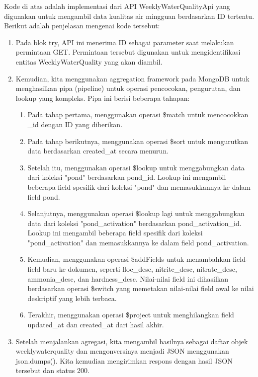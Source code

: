 \begin{enumerate}[1.]
Kode di atas adalah implementasi dari API WeeklyWaterQualityApi yang digunakan untuk mengambil data kualitas air mingguan berdasarkan ID tertentu. Berikut adalah penjelasan mengenai kode tersebut:

\begin{enumerate}

\item Pada blok try, API ini menerima ID sebagai parameter saat melakukan permintaan GET. Permintaan tersebut digunakan untuk mengidentifikasi entitas WeeklyWaterQuality yang akan diambil.

\item Kemudian, kita menggunakan aggregation framework pada MongoDB untuk menghasilkan pipa (pipeline) untuk operasi pencocokan, pengurutan, dan lookup yang kompleks. Pipa ini berisi beberapa tahapan:

\begin{enumerate}
\item Pada tahap pertama, menggunakan operasi \$match untuk mencocokkan \_id dengan ID yang diberikan.
\item Pada tahap berikutnya, menggunakan operasi \$sort untuk mengurutkan data berdasarkan created\_at secara menurun.
\item Setelah itu, menggunakan operasi \$lookup untuk menggabungkan data dari koleksi "pond" berdasarkan pond\_id. Lookup ini mengambil beberapa field spesifik dari koleksi "pond" dan memasukkannya ke dalam field pond.
\item Selanjutnya, menggunakan operasi \$lookup lagi untuk menggabungkan data dari koleksi "pond\_activation" berdasarkan pond\_activation\_id. Lookup ini mengambil beberapa field spesifik dari koleksi "pond\_activation" dan memasukkannya ke dalam field pond\_activation.
\item Kemudian, menggunakan operasi \$addFields untuk menambahkan field-field baru ke dokumen, seperti floc\_desc, nitrite\_desc, nitrate\_desc, ammonia\_desc, dan hardness\_desc. Nilai-nilai field ini dihasilkan berdasarkan operasi \$switch yang memetakan nilai-nilai field awal ke nilai deskriptif yang lebih terbaca.
\item Terakhir, menggunakan operasi \$project untuk menghilangkan field updated\_at dan created\_at dari hasil akhir.
\end{enumerate}

\item Setelah menjalankan agregasi, kita mengambil hasilnya sebagai daftar objek weeklywaterquality dan mengonversinya menjadi JSON menggunakan json.dumps(). Kita kemudian mengirimkan respons dengan hasil JSON tersebut dan status 200.


\end{enumerate}
\end{enumerate}
